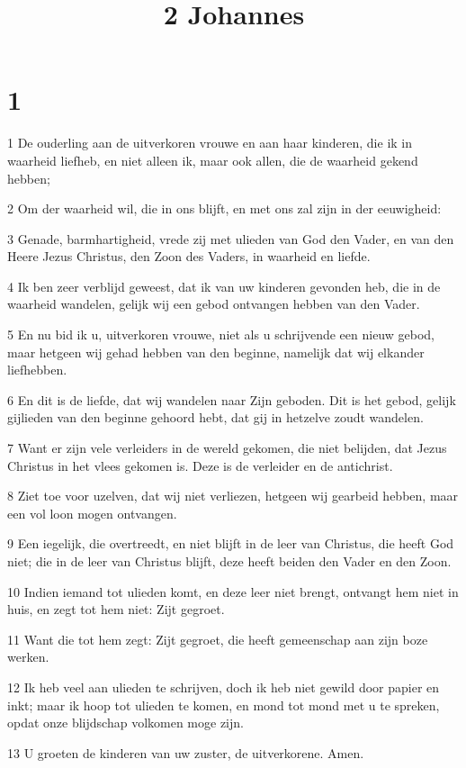

\title{2 Johannes}



\chapter{1}

\par 1 De ouderling aan de uitverkoren vrouwe en aan haar kinderen, die ik in waarheid liefheb, en niet alleen ik, maar ook allen, die de waarheid gekend hebben;
\par 2 Om der waarheid wil, die in ons blijft, en met ons zal zijn in der eeuwigheid:
\par 3 Genade, barmhartigheid, vrede zij met ulieden van God den Vader, en van den Heere Jezus Christus, den Zoon des Vaders, in waarheid en liefde.
\par 4 Ik ben zeer verblijd geweest, dat ik van uw kinderen gevonden heb, die in de waarheid wandelen, gelijk wij een gebod ontvangen hebben van den Vader.
\par 5 En nu bid ik u, uitverkoren vrouwe, niet als u schrijvende een nieuw gebod, maar hetgeen wij gehad hebben van den beginne, namelijk dat wij elkander liefhebben.
\par 6 En dit is de liefde, dat wij wandelen naar Zijn geboden. Dit is het gebod, gelijk gijlieden van den beginne gehoord hebt, dat gij in hetzelve zoudt wandelen.
\par 7 Want er zijn vele verleiders in de wereld gekomen, die niet belijden, dat Jezus Christus in het vlees gekomen is. Deze is de verleider en de antichrist.
\par 8 Ziet toe voor uzelven, dat wij niet verliezen, hetgeen wij gearbeid hebben, maar een vol loon mogen ontvangen.
\par 9 Een iegelijk, die overtreedt, en niet blijft in de leer van Christus, die heeft God niet; die in de leer van Christus blijft, deze heeft beiden den Vader en den Zoon.
\par 10 Indien iemand tot ulieden komt, en deze leer niet brengt, ontvangt hem niet in huis, en zegt tot hem niet: Zijt gegroet.
\par 11 Want die tot hem zegt: Zijt gegroet, die heeft gemeenschap aan zijn boze werken.
\par 12 Ik heb veel aan ulieden te schrijven, doch ik heb niet gewild door papier en inkt; maar ik hoop tot ulieden te komen, en mond tot mond met u te spreken, opdat onze blijdschap volkomen moge zijn.
\par 13 U groeten de kinderen van uw zuster, de uitverkorene. Amen.




